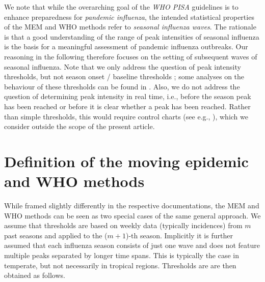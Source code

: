 \documentclass{article}
\begin{document}
\noindent We note that while the overarching goal of the \textit{WHO PISA} guidelines is to enhance preparedness for \textit{pandemic influenza}, the intended statistical properties of the MEM and WHO methods refer to \textit{seasonal influenza waves}. The rationale is that a good understanding of the range of peak intensities of seasonal influenza is the basis for a meaningful assessment of pandemic influenza outbreaks. Our reasoning in the following therefore focuses on the setting of subsequent waves of seasonal influenza. Note that we only address the question of peak intensity thresholds, but not season onset / baseline thresholds \citep{Vega2013}; some analyses on the behaviour of these thresholds can be found in \cite{Pang2023}. Also, we do not address the question of determining peak intensity in real time, i.e., before the season peak has been reached or before it is clear whether a peak has been reached. Rather than simple thresholds, this would require control charts (see e.g., \citealt{Liu2019}), which we consider outside the scope of the present article.

\section{Definition of the moving epidemic and WHO methods}
\label{sec:definitions}

While framed slightly differently in the respective documentations, the MEM and WHO methods can be seen as two special cases of the same general approach. We assume that thresholds are based on weekly data (typically incidences) from $m$ past seasons and applied to the ($m + 1$)-th season. Implicitly it is further assumed that each influenza season consists of just one wave and does not feature multiple peaks separated by longer time spans. This is typically the case in temperate, but not necessarily in tropical regions. Thresholds are are then obtained as follows.
\end{document}
